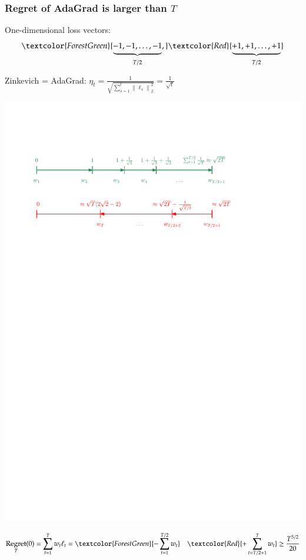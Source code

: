 \documentclass[usenames,dvipsnames]{beamer}
\DeclareMathOperator{\Regret}{Regret}
\newcommand{\norm}[1]{\left\|#1\right\|}
\begin{document}
\begin{frame}
\frametitle{Regret of AdaGrad is larger than $T$}

One-dimensional loss vectors:
$$
\textcolor{ForestGreen}{\underbrace{-1, -1, \dots, -1}_{T/2},} \textcolor{Red}{\underbrace{+1, +1, \dots, +1}_{T/2}}
$$

Zinkevich = AdaGrad: \quad $\eta_t = \frac{1}{\sqrt{\sum_{s=1}^t \norm{\ell_s}_2^2}} = \frac{1}{\sqrt{t}}$

\pause

\vspace{0.3cm}

\begin{center}
\includegraphics[scale=0.5]{gd-lower-bound}
\end{center}
$$
\Regret_T(0) = \sum_{t=1}^T w_t \ell_t = \textcolor{ForestGreen}{-\sum_{t=1}^{T/2} w_t} \quad \textcolor{Red}{+ \sum_{t={T/2+1}}^T w_t} \ge \frac{T^{3/2}}{20}
$$
\end{frame}
\end{document}

